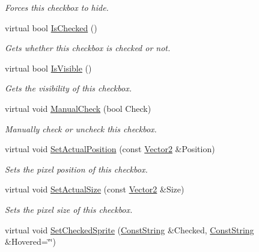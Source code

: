 \begin{DoxyCompactItemize}
\begin{DoxyCompactList}\small\item\em Forces this checkbox to hide. \item\end{DoxyCompactList}\item 
virtual bool \hyperlink{classphys_1_1UI_1_1CheckBox_acf01a9b19251212fb626d022d02b53d5}{IsChecked} ()
\begin{DoxyCompactList}\small\item\em Gets whether this checkbox is checked or not. \item\end{DoxyCompactList}\item 
virtual bool \hyperlink{classphys_1_1UI_1_1CheckBox_a8a2be0cba227f0921071fb14de24f76d}{IsVisible} ()
\begin{DoxyCompactList}\small\item\em Gets the visibility of this checkbox. \item\end{DoxyCompactList}\item 
virtual void \hyperlink{classphys_1_1UI_1_1CheckBox_a3720c3f110a3594e45a8115c21deba00}{ManualCheck} (bool Check)
\begin{DoxyCompactList}\small\item\em Manually check or uncheck this checkbox. \item\end{DoxyCompactList}\item 
virtual void \hyperlink{classphys_1_1UI_1_1CheckBox_a186fcf91ed44c813d6dbd9cb53ff60c3}{SetActualPosition} (const \hyperlink{classphys_1_1Vector2}{Vector2} \&Position)
\begin{DoxyCompactList}\small\item\em Sets the pixel position of this checkbox. \item\end{DoxyCompactList}\item 
virtual void \hyperlink{classphys_1_1UI_1_1CheckBox_a623769e2a3ba24cc1a3e2e64b72edb41}{SetActualSize} (const \hyperlink{classphys_1_1Vector2}{Vector2} \&Size)
\begin{DoxyCompactList}\small\item\em Sets the pixel size of this checkbox. \item\end{DoxyCompactList}\item 
virtual void \hyperlink{classphys_1_1UI_1_1CheckBox_a283705ddaab86875a3a025d34f53bec1}{SetCheckedSprite} (\hyperlink{namespacephys_a5ce5049f8b4bf88d6413c47b504ebb31}{ConstString} \&Checked, \hyperlink{namespacephys_a5ce5049f8b4bf88d6413c47b504ebb31}{ConstString} \&Hovered=\char`\"{}\char`\"{})

\end{DoxyCompactItemize}
